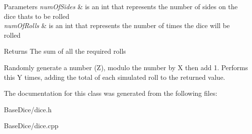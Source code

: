 \begin{DoxyParams}{Parameters}
{\em num\+Of\+Sides} & is an int that represents the number of sides on the dice thats to be rolled \\
\hline
{\em num\+Of\+Rolls} & is an int that represents the number of times the dice will be rolled \\
\hline
\end{DoxyParams}
\begin{DoxyReturn}{Returns}
The sum of all the required rolls
\end{DoxyReturn}
Randomly generate a number (Z), modulo the number by X then add 1. Performs this Y times, adding the total of each simulated roll to the returned value. 

The documentation for this class was generated from the following files\+:\begin{DoxyCompactItemize}
\item 
Base\+Dice/dice.\+h\item 
Base\+Dice/dice.\+cpp\end{DoxyCompactItemize}
